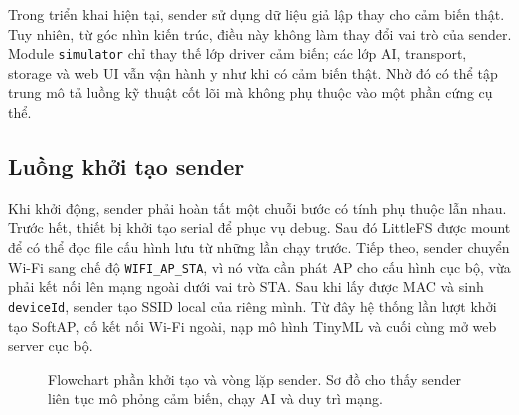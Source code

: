 \documentclass[12pt,a4paper]{report}
\newcommand{\codevar}[1]{{\textcolor{diagramcode}{\texttt{#1}}}}
\newcommand{\codedata}[1]{{\textcolor{diagramdata}{\texttt{#1}}}}
\begin{document}
Trong triển khai hiện tại, sender sử dụng dữ liệu giả lập thay cho cảm biến thật. Tuy nhiên, từ góc nhìn kiến trúc, điều này không làm thay đổi vai trò của sender. Module \texttt{simulator} chỉ thay thế lớp driver cảm biến; các lớp AI, transport, storage và web UI vẫn vận hành y như khi có cảm biến thật. Nhờ đó có thể tập trung mô tả luồng kỹ thuật cốt lõi mà không phụ thuộc vào một phần cứng cụ thể.

\subsection{Luồng khởi tạo sender}
Khi khởi động, sender phải hoàn tất một chuỗi bước có tính phụ thuộc lẫn nhau. Trước hết, thiết bị khởi tạo serial để phục vụ debug. Sau đó LittleFS được mount để có thể đọc file cấu hình lưu từ những lần chạy trước. Tiếp theo, sender chuyển Wi-Fi sang chế độ \texttt{WIFI\_AP\_STA}, vì nó vừa cần phát AP cho cấu hình cục bộ, vừa phải kết nối lên mạng ngoài dưới vai trò STA. Sau khi lấy được MAC và sinh \texttt{deviceId}, sender tạo SSID local của riêng mình. Từ đây hệ thống lần lượt khởi tạo SoftAP, cố kết nối Wi-Fi ngoài, nạp mô hình TinyML và cuối cùng mở web server cục bộ.

\begin{figure}[H]
\centering
{}
\caption{Flowchart phần khởi tạo và vòng lặp sender. Sơ đồ cho thấy sender liên tục mô phỏng cảm biến, chạy AI và duy trì mạng.}
\label{fig:sender-loop}
\end{figure}
\end{document}
